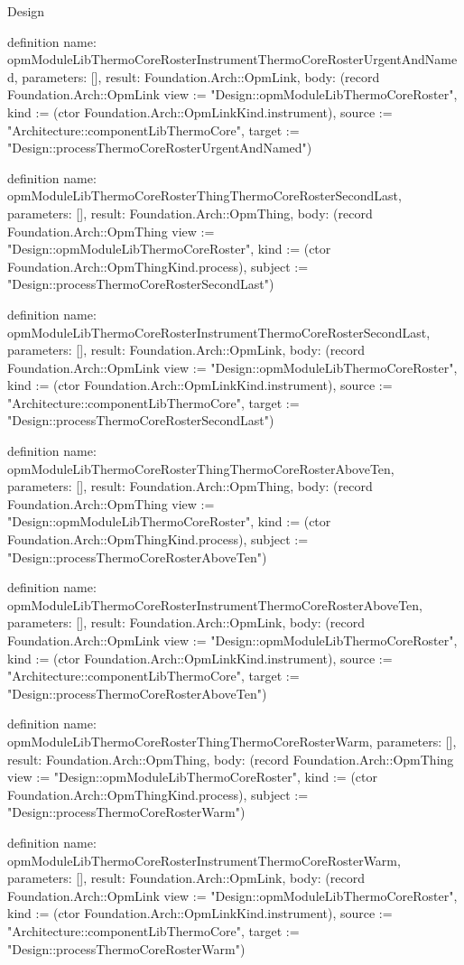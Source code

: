 \begin{lexlean}{Design}
\begin{semanticmodule}
definition{
  name: opmModuleLibThermoCoreRosterInstrumentThermoCoreRosterUrgentAndNamed,
  parameters: [],
  result: Foundation.Arch::OpmLink,
  body: (record Foundation.Arch::OpmLink {view := "Design::opmModuleLibThermoCoreRoster", kind := (ctor Foundation.Arch::OpmLinkKind.instrument), source := "Architecture::componentLibThermoCore", target := "Design::processThermoCoreRosterUrgentAndNamed"})
}

definition{
  name: opmModuleLibThermoCoreRosterThingThermoCoreRosterSecondLast,
  parameters: [],
  result: Foundation.Arch::OpmThing,
  body: (record Foundation.Arch::OpmThing {view := "Design::opmModuleLibThermoCoreRoster", kind := (ctor Foundation.Arch::OpmThingKind.process), subject := "Design::processThermoCoreRosterSecondLast"})
}

definition{
  name: opmModuleLibThermoCoreRosterInstrumentThermoCoreRosterSecondLast,
  parameters: [],
  result: Foundation.Arch::OpmLink,
  body: (record Foundation.Arch::OpmLink {view := "Design::opmModuleLibThermoCoreRoster", kind := (ctor Foundation.Arch::OpmLinkKind.instrument), source := "Architecture::componentLibThermoCore", target := "Design::processThermoCoreRosterSecondLast"})
}

definition{
  name: opmModuleLibThermoCoreRosterThingThermoCoreRosterAboveTen,
  parameters: [],
  result: Foundation.Arch::OpmThing,
  body: (record Foundation.Arch::OpmThing {view := "Design::opmModuleLibThermoCoreRoster", kind := (ctor Foundation.Arch::OpmThingKind.process), subject := "Design::processThermoCoreRosterAboveTen"})
}

definition{
  name: opmModuleLibThermoCoreRosterInstrumentThermoCoreRosterAboveTen,
  parameters: [],
  result: Foundation.Arch::OpmLink,
  body: (record Foundation.Arch::OpmLink {view := "Design::opmModuleLibThermoCoreRoster", kind := (ctor Foundation.Arch::OpmLinkKind.instrument), source := "Architecture::componentLibThermoCore", target := "Design::processThermoCoreRosterAboveTen"})
}

definition{
  name: opmModuleLibThermoCoreRosterThingThermoCoreRosterWarm,
  parameters: [],
  result: Foundation.Arch::OpmThing,
  body: (record Foundation.Arch::OpmThing {view := "Design::opmModuleLibThermoCoreRoster", kind := (ctor Foundation.Arch::OpmThingKind.process), subject := "Design::processThermoCoreRosterWarm"})
}

definition{
  name: opmModuleLibThermoCoreRosterInstrumentThermoCoreRosterWarm,
  parameters: [],
  result: Foundation.Arch::OpmLink,
  body: (record Foundation.Arch::OpmLink {view := "Design::opmModuleLibThermoCoreRoster", kind := (ctor Foundation.Arch::OpmLinkKind.instrument), source := "Architecture::componentLibThermoCore", target := "Design::processThermoCoreRosterWarm"})
}


\end{semanticmodule}
\end{lexlean}
